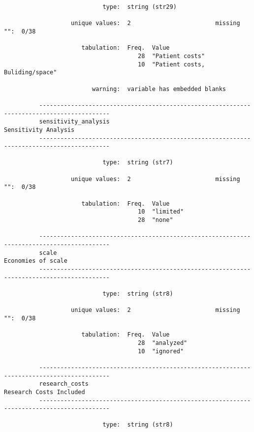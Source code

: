 \documentclass{article}
\begin{document}
\begin{verbatim}
                            type:  string (str29)
          
                   unique values:  2                        missing "":  0/38
          
                      tabulation:  Freq.  Value
                                      28  "Patient costs"
                                      10  "Patient costs, Buliding/space"
          
                         warning:  variable has embedded blanks
          
          ------------------------------------------------------------------------------------------
          sensitivity_analysis                                                  Sensitivity Analysis
          ------------------------------------------------------------------------------------------
          
                            type:  string (str7)
          
                   unique values:  2                        missing "":  0/38
          
                      tabulation:  Freq.  Value
                                      10  "limited"
                                      28  "none"
          
          ------------------------------------------------------------------------------------------
          scale                                                                   Economies of scale
          ------------------------------------------------------------------------------------------
          
                            type:  string (str8)
          
                   unique values:  2                        missing "":  0/38
          
                      tabulation:  Freq.  Value
                                      28  "analyzed"
                                      10  "ignored"
          
          ------------------------------------------------------------------------------------------
          research_costs                                                     Research Costs Included
          ------------------------------------------------------------------------------------------
          
                            type:  string (str8)
          

\end{verbatim}
\end{document}
